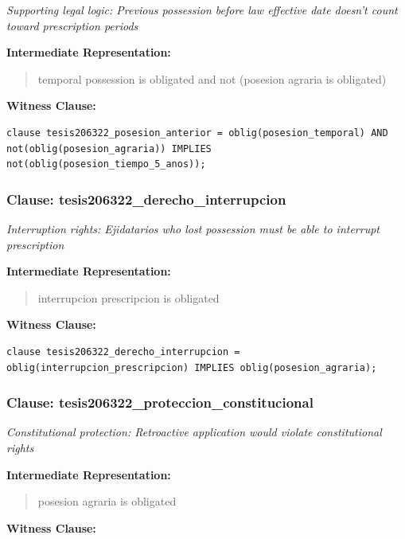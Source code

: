 \documentclass[11pt,a4paper]{article}
\begin{document}
\textit{Supporting legal logic: Previous possession before law effective date doesn't count toward prescription periods}

\textbf{Intermediate Representation:}

\begin{quote}
temporal possession is obligated and not (posesion agraria is obligated)
\end{quote}

\textbf{Witness Clause:}

\begin{lstlisting}[style=witnessstyle, language=Witness]
clause tesis206322_posesion_anterior = oblig(posesion_temporal) AND not(oblig(posesion_agraria)) IMPLIES not(oblig(posesion_tiempo_5_anos));
\end{lstlisting}

\subsubsection{Clause: tesis206322\_derecho\_interrupcion}

\textit{Interruption rights: Ejidatarios who lost possession must be able to interrupt prescription}

\textbf{Intermediate Representation:}

\begin{quote}
interrupcion prescripcion is obligated
\end{quote}

\textbf{Witness Clause:}

\begin{lstlisting}[style=witnessstyle, language=Witness]
clause tesis206322_derecho_interrupcion = oblig(interrupcion_prescripcion) IMPLIES oblig(posesion_agraria);
\end{lstlisting}

\subsubsection{Clause: tesis206322\_proteccion\_constitucional}

\textit{Constitutional protection: Retroactive application would violate constitutional rights}

\textbf{Intermediate Representation:}

\begin{quote}
posesion agraria is obligated
\end{quote}

\textbf{Witness Clause:}
\end{document}
